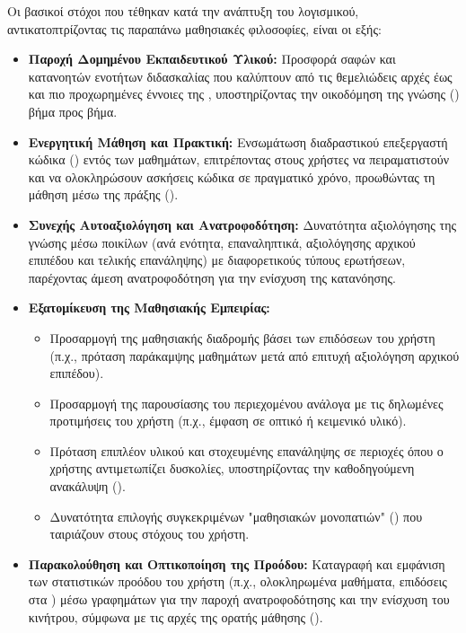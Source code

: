 Οι βασικοί στόχοι που τέθηκαν κατά την ανάπτυξη του λογισμικού, αντικατοπτρίζοντας τις παραπάνω μαθησιακές φιλοσοφίες, είναι οι εξής:
\begin{itemize}[leftmargin=*, noitemsep]
    \item \textbf{Παροχή Δομημένου Εκπαιδευτικού Υλικού:} Προσφορά σαφών και κατανοητών ενοτήτων διδασκαλίας που καλύπτουν από τις θεμελιώδεις αρχές έως και πιο προχωρημένες έννοιες της , υποστηρίζοντας την οικοδόμηση της γνώσης () βήμα προς βήμα.
    \item \textbf{Ενεργητική Μάθηση και Πρακτική:} Ενσωμάτωση διαδραστικού επεξεργαστή κώδικα () εντός των μαθημάτων, επιτρέποντας στους χρήστες να πειραματιστούν και να ολοκληρώσουν ασκήσεις κώδικα σε πραγματικό χρόνο, προωθώντας τη μάθηση μέσω της πράξης ().
    \item \textbf{Συνεχής Αυτοαξιολόγηση και Ανατροφοδότηση:} Δυνατότητα αξιολόγησης της γνώσης μέσω ποικίλων  (ανά ενότητα, επαναληπτικά, αξιολόγησης αρχικού επιπέδου και τελικής επανάληψης) με διαφορετικούς τύπους ερωτήσεων, παρέχοντας άμεση ανατροφοδότηση για την ενίσχυση της κατανόησης.
    \item \textbf{Εξατομίκευση της Μαθησιακής Εμπειρίας:}
    \begin{itemize}[leftmargin=*, noitemsep]
        \item Προσαρμογή της μαθησιακής διαδρομής βάσει των επιδόσεων του χρήστη (π.χ., πρόταση παράκαμψης μαθημάτων μετά από επιτυχή αξιολόγηση αρχικού επιπέδου).
        \item Προσαρμογή της παρουσίασης του περιεχομένου ανάλογα με τις δηλωμένες προτιμήσεις του χρήστη (π.χ., έμφαση σε οπτικό ή κειμενικό υλικό).
        \item Πρόταση επιπλέον υλικού και στοχευμένης επανάληψης σε περιοχές όπου ο χρήστης αντιμετωπίζει δυσκολίες, υποστηρίζοντας την καθοδηγούμενη ανακάλυψη ().
        \item Δυνατότητα επιλογής συγκεκριμένων "μαθησιακών μονοπατιών" () που ταιριάζουν στους στόχους του χρήστη.
    \end{itemize}
    \item \textbf{Παρακολούθηση και Οπτικοποίηση της Προόδου:} Καταγραφή και εμφάνιση των στατιστικών προόδου του χρήστη (π.χ., ολοκληρωμένα μαθήματα, επιδόσεις στα ) μέσω γραφημάτων για την παροχή ανατροφοδότησης και την ενίσχυση του κινήτρου, σύμφωνα με τις αρχές της ορατής μάθησης ().
\end{itemize}

